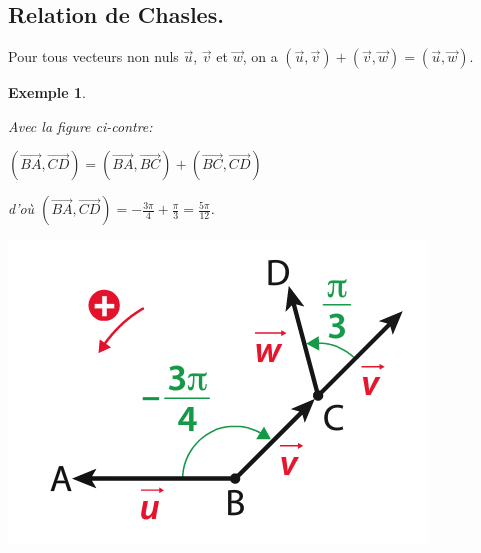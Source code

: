 \documentclass[a4paper,11pt]{article}
\theoremstyle{break}
\newcounter{enonce}
\newtheorem{exemple}[enonce]{Exemple}
\begin{document}
 \subsection{Relation de Chasles.}
 
 \begin{theorem}
  Pour tous vecteurs non nuls $\vec{u}$, $\vec{v}$ et $\vec{w}$, on a 
  $(\vec{u},\vec{v})+(\vec{v},\vec{w})=(\vec{u},\vec{w})$.
 \end{theorem}
 
 \begin{exemple}
 \begin{multicols}{2} 
 
  Avec la figure ci-contre:   
  
   $(\vec{BA},\vec{CD})=(\vec{BA},\vec{BC})+(\vec{BC},\vec{CD})$
   
   d'où $(\vec{BA},\vec{CD})=-\frac{3\pi}{4}+\frac{\pi}{3}=\frac{5\pi}{12}$.
   
   \columnbreak 
   \includegraphics[scale=0.5]{../Images/relChasles.png}
  \end{multicols}

 \end{exemple}
\end{document}
